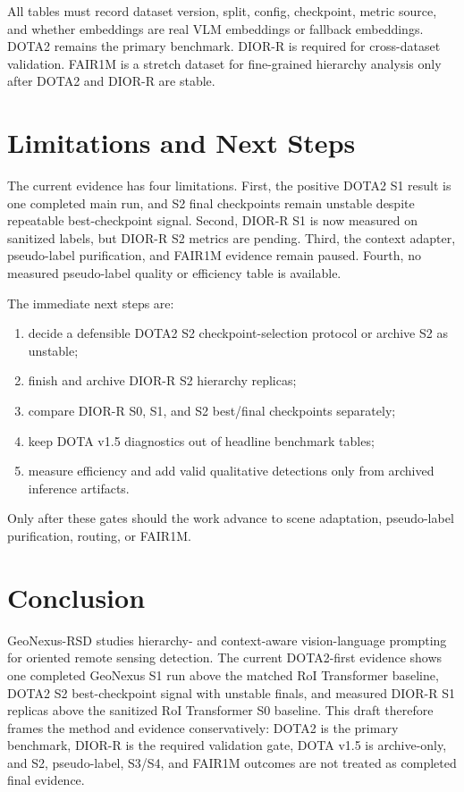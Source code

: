 \documentclass[10pt]{article}
\begin{document}
All tables must record dataset version, split, config, checkpoint, metric source, and whether embeddings are real VLM embeddings or fallback embeddings. DOTA2 remains the primary benchmark. DIOR-R is required for cross-dataset validation. FAIR1M is a stretch dataset for fine-grained hierarchy analysis only after DOTA2 and DIOR-R are stable.

\section{Limitations and Next Steps}

The current evidence has four limitations. First, the positive DOTA2 S1 result is one completed main run, and S2 final checkpoints remain unstable despite repeatable best-checkpoint signal. Second, DIOR-R S1 is now measured on sanitized labels, but DIOR-R S2 metrics are pending. Third, the context adapter, pseudo-label purification, and FAIR1M evidence remain paused. Fourth, no measured pseudo-label quality or efficiency table is available.

The immediate next steps are:
\begin{enumerate}
\item decide a defensible DOTA2 S2 checkpoint-selection protocol or archive S2 as unstable;
\item finish and archive DIOR-R S2 hierarchy replicas;
\item compare DIOR-R S0, S1, and S2 best/final checkpoints separately;
\item keep DOTA v1.5 diagnostics out of headline benchmark tables;
\item measure efficiency and add valid qualitative detections only from archived inference artifacts.
\end{enumerate}

Only after these gates should the work advance to scene adaptation, pseudo-label purification, routing, or FAIR1M.

\section{Conclusion}

GeoNexus-RSD studies hierarchy- and context-aware vision-language prompting for oriented remote sensing detection. The current DOTA2-first evidence shows one completed GeoNexus S1 run above the matched RoI Transformer baseline, DOTA2 S2 best-checkpoint signal with unstable finals, and measured DIOR-R S1 replicas above the sanitized RoI Transformer S0 baseline. This draft therefore frames the method and evidence conservatively: DOTA2 is the primary benchmark, DIOR-R is the required validation gate, DOTA v1.5 is archive-only, and S2, pseudo-label, S3/S4, and FAIR1M outcomes are not treated as completed final evidence.
\end{document}
